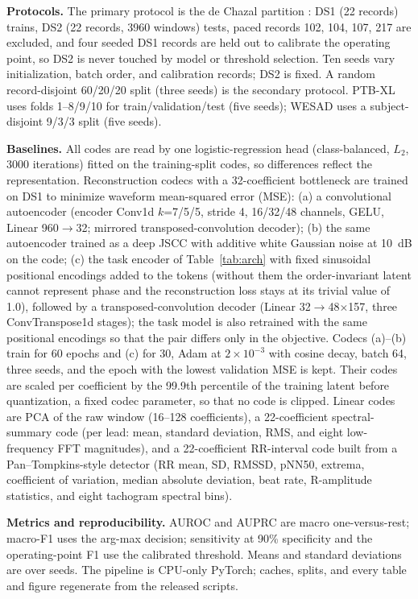 \documentclass[journal]{IEEEtran}
\begin{document}
\textbf{Protocols.} The primary protocol is the de Chazal partition \cite{dechazal2004}: DS1 (22 records) trains, DS2 (22 records, 3960 windows) tests, paced records 102, 104, 107, 217 are excluded, and four seeded DS1 records are held out to calibrate the operating point, so DS2 is never touched by model or threshold selection. Ten seeds vary initialization, batch order, and calibration records; DS2 is fixed. A random record-disjoint 60/20/20 split (three seeds) is the secondary protocol. PTB-XL uses folds 1--8/9/10 for train/validation/test (five seeds); WESAD uses a subject-disjoint 9/3/3 split (five seeds).

\textbf{Baselines.} All codes are read by one logistic-regression head (class-balanced, $L_2$, 3000 iterations) fitted on the training-split codes, so differences reflect the representation. Reconstruction codecs with a 32-coefficient bottleneck are trained on DS1 to minimize waveform mean-squared error (MSE): (a) a convolutional autoencoder (encoder Conv1d $k$=7/5/5, stride 4, 16/32/48 channels, GELU, Linear 960$\to$32; mirrored transposed-convolution decoder); (b) the same autoencoder trained as a deep JSCC with additive white Gaussian noise at 10~dB on the code\ifhavepe; (c) the task encoder of Table~\ref{tab:arch} with fixed sinusoidal positional encodings added to the tokens (without them the order-invariant latent cannot represent phase and the reconstruction loss stays at its trivial value of 1.0), followed by a transposed-convolution decoder (Linear 32$\to$48$\times$157, three ConvTranspose1d stages); the task model is also retrained with the same positional encodings so that the pair differs only in the objective\fi. Codecs (a)--(b) train for 60 epochs\ifhavepe{} and (c) for 30\fi, Adam at $2\times10^{-3}$ with cosine decay, batch 64, three seeds, and the epoch with the lowest validation MSE is kept. Their codes are scaled per coefficient by the 99.9th percentile of the training latent before quantization, a fixed codec parameter, so that no code is clipped. Linear codes are PCA of the raw window (16--128 coefficients), a 22-coefficient spectral-summary code (per lead: mean, standard deviation, RMS, and eight low-frequency FFT magnitudes), and a 22-coefficient RR-interval code built from a Pan--Tompkins-style detector \cite{pan1985} (RR mean, SD, RMSSD, pNN50, extrema, coefficient of variation, median absolute deviation, beat rate, R-amplitude statistics, and eight tachogram spectral bins).

\textbf{Metrics and reproducibility.} AUROC and AUPRC are macro one-versus-rest; macro-F1 uses the arg-max decision; sensitivity at 90\% specificity and the operating-point F1 use the calibrated threshold. Means and standard deviations are over seeds. The pipeline is CPU-only PyTorch; caches, splits, and every table and figure regenerate from the released scripts.
\end{document}

